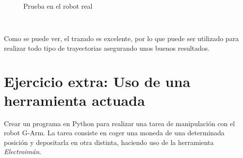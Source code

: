\begin{figure} [ht!]
    \centering  
    \hspace{1cm}
    \caption{Prueba en el robot real}
    \label{fig:real_draw}
\end{figure}\ 

Como se puede ver, el trazado es excelente, por lo que puede ser utilizado para realizar todo tipo de trayectorias asegurando unos buenos resultados.


\newpage
\section*{Ejercicio extra: Uso de una herramienta actuada}
Crear un programa en Python para realizar una tarea de manipulación con el robot G-Arm. La tarea consiste en coger una moneda de una determinada posición y 
depositarla en otra distinta, haciendo uso de la herramienta \textit{Electroimán}.

